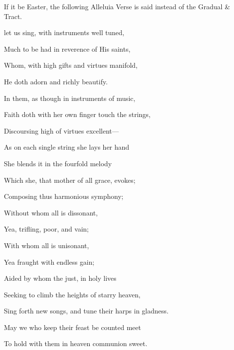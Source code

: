 
\begin{rubric}
    If it be Easter, the following Alleluia Verse is said instead of the Gradual \& Tract.
\end{rubric}


\begin{multicols}{2}
 let us sing, with instruments well tuned,\par
{}
Much to be had in reverence of His saints,

Whom, with high gifts and virtues manifold,

He doth adorn and richly beautify.

In them, as though in instruments of music,

Faith doth with her own finger touch the strings,

Discoursing high of virtues excellent---

As on each single string she lays her hand

She blends it in the fourfold melody

Which she, that mother of all grace, evokes;

Composing thus harmonious symphony;

Without whom all is dissonant,

Yea, trifling, poor, and vain;

With whom all is unisonant,

Yea fraught with endless gain;

Aided by whom the just, in holy lives

Seeking to climb the heights of starry heaven,

Sing forth new songs, and tune their harps in gladness.

May we who keep their feast be counted meet

To hold with them in heaven communion sweet.
\end{multicols}
